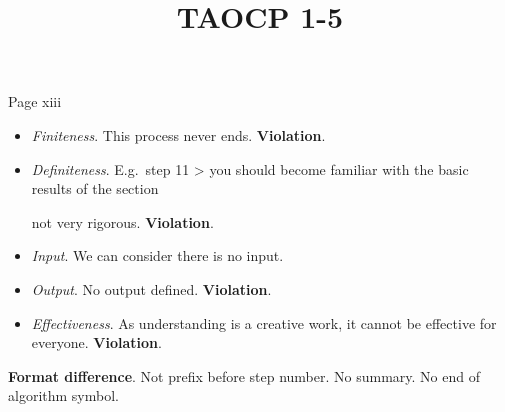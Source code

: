 \documentclass{article}
\title{TAOCP 1\mbox{-}5}
\begin{document}
\maketitle

Page xiii

\begin{itemize}
\item \textit{Finiteness}. This process never ends. \textbf{Violation}.
\item \textit{Definiteness}. E.g.\ step 11
       > you should become familiar with the basic results of the section

       not very rigorous. \textbf{Violation}.
\item \textit{Input}. We can consider there is no input.
\item \textit{Output}. No output defined. \textbf{Violation}.
\item \textit{Effectiveness}. As understanding is a creative work, it cannot be effective for everyone. \textbf{Violation}.
\end{itemize}

\textbf{Format difference}. Not prefix before step number. No summary. No end of algorithm symbol.
\end{document}
